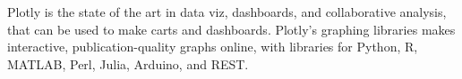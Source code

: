 Plotly is the state of the art in data viz, dashboards, and collaborative analysis, that can be used to make carts and dashboards.
Plotly's graphing libraries makes interactive, publication-quality graphs online, with libraries for Python, R, MATLAB, Perl, Julia, Arduino, and REST.
